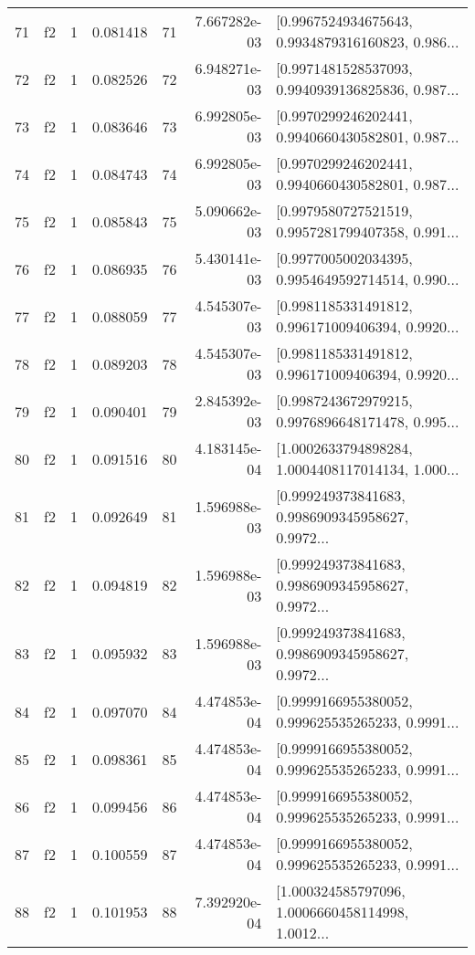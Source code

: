 \begin{tabular}{lllrlrl}
71  &  f2 &   1 &  0.081418 &   71 &  7.667282e-03 &  [0.9967524934675643, 0.9934879316160823, 0.986... \\
72  &  f2 &   1 &  0.082526 &   72 &  6.948271e-03 &  [0.9971481528537093, 0.9940939136825836, 0.987... \\
73  &  f2 &   1 &  0.083646 &   73 &  6.992805e-03 &  [0.9970299246202441, 0.9940660430582801, 0.987... \\
74  &  f2 &   1 &  0.084743 &   74 &  6.992805e-03 &  [0.9970299246202441, 0.9940660430582801, 0.987... \\
75  &  f2 &   1 &  0.085843 &   75 &  5.090662e-03 &  [0.9979580727521519, 0.9957281799407358, 0.991... \\
76  &  f2 &   1 &  0.086935 &   76 &  5.430141e-03 &  [0.9977005002034395, 0.9954649592714514, 0.990... \\
77  &  f2 &   1 &  0.088059 &   77 &  4.545307e-03 &  [0.9981185331491812, 0.996171009406394, 0.9920... \\
78  &  f2 &   1 &  0.089203 &   78 &  4.545307e-03 &  [0.9981185331491812, 0.996171009406394, 0.9920... \\
79  &  f2 &   1 &  0.090401 &   79 &  2.845392e-03 &  [0.9987243672979215, 0.9976896648171478, 0.995... \\
80  &  f2 &   1 &  0.091516 &   80 &  4.183145e-04 &  [1.0002633794898284, 1.0004408117014134, 1.000... \\
81  &  f2 &   1 &  0.092649 &   81 &  1.596988e-03 &  [0.999249373841683, 0.9986909345958627, 0.9972... \\
82  &  f2 &   1 &  0.094819 &   82 &  1.596988e-03 &  [0.999249373841683, 0.9986909345958627, 0.9972... \\
83  &  f2 &   1 &  0.095932 &   83 &  1.596988e-03 &  [0.999249373841683, 0.9986909345958627, 0.9972... \\
84  &  f2 &   1 &  0.097070 &   84 &  4.474853e-04 &  [0.9999166955380052, 0.999625535265233, 0.9991... \\
85  &  f2 &   1 &  0.098361 &   85 &  4.474853e-04 &  [0.9999166955380052, 0.999625535265233, 0.9991... \\
86  &  f2 &   1 &  0.099456 &   86 &  4.474853e-04 &  [0.9999166955380052, 0.999625535265233, 0.9991... \\
87  &  f2 &   1 &  0.100559 &   87 &  4.474853e-04 &  [0.9999166955380052, 0.999625535265233, 0.9991... \\
88  &  f2 &   1 &  0.101953 &   88 &  7.392920e-04 &  [1.000324585797096, 1.0006660458114998, 1.0012... \\

\end{tabular}

